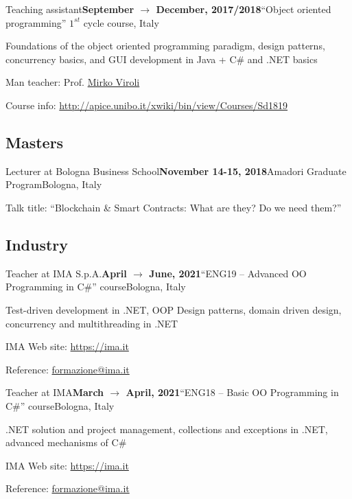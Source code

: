 \begin{activity}{Teaching assistant}{\textbf{September $\rightarrow$ December, 2017/2018}}{``Object oriented programming'' $1^{st}$ cycle course}{\uniboen, Italy}
    \item Foundations of the object oriented programming paradigm, design patterns, concurrency basics, and GUI development in Java + C\# and .NET basics
    \item Man teacher: Prof. \href{mailto:mirko.viroli@unibo.it}{Mirko Viroli}
    \item Course info: \url{http://apice.unibo.it/xwiki/bin/view/Courses/Sd1819}
\end{activity}

\subsection*{Masters}

\begin{activity}{Lecturer at Bologna Business School}{\textbf{November 14-15, 2018}}{Amadori Graduate Program}{Bologna, Italy}
	\item Talk title: ``Blockchain \& Smart Contracts: What are they? Do we need them?''
\end{activity}

\subsection*{Industry}

\begin{activity}{Teacher at IMA S.p.A.}{\textbf{April $\rightarrow$ June, 2021}}{``ENG19 -- Advanced OO Programming in C\#'' course}{Bologna, Italy}
    \item Test-driven development in .NET, OOP Design patterns, domain driven design, concurrency and multithreading in .NET
    \item IMA Web site: \url{https://ima.it}
    \item Reference: \href{mailto:formazione@ima.it}{formazione@ima.it}
\end{activity}

\begin{activity}{Teacher at IMA}{\textbf{March $\rightarrow$ April, 2021}}{``ENG18 -- Basic OO Programming in C\#'' course}{Bologna, Italy}
    \item .NET solution and project management, collections and exceptions in .NET, advanced mechanisms of C\#
    \item IMA Web site: \url{https://ima.it}
    \item Reference: \href{mailto:formazione@ima.it}{formazione@ima.it}
\end{activity}

